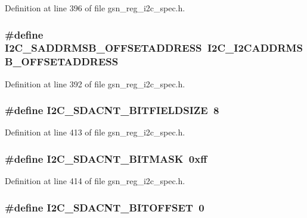 Definition at line 396 of file gsn\_\-reg\_\-i2c\_\-spec.h.

\hypertarget{a00558_a096049abd13309f06e39d53741cd8c53}{
\subsubsection[{I2C\_\-SADDRMSB\_\-OFFSETADDRESS}]{\setlength{\rightskip}{0pt plus 5cm}\#define I2C\_\-SADDRMSB\_\-OFFSETADDRESS~I2C\_\-I2CADDRMSB\_\-OFFSETADDRESS}}
\label{a00558_a096049abd13309f06e39d53741cd8c53}


Definition at line 392 of file gsn\_\-reg\_\-i2c\_\-spec.h.

\hypertarget{a00558_acf0200b09d20b7746674e7951f0fa3d8}{
\subsubsection[{I2C\_\-SDACNT\_\-BITFIELDSIZE}]{\setlength{\rightskip}{0pt plus 5cm}\#define I2C\_\-SDACNT\_\-BITFIELDSIZE~8}}
\label{a00558_acf0200b09d20b7746674e7951f0fa3d8}


Definition at line 413 of file gsn\_\-reg\_\-i2c\_\-spec.h.

\hypertarget{a00558_aab1926caecb04bb69a177f0e4c88cf61}{
\subsubsection[{I2C\_\-SDACNT\_\-BITMASK}]{\setlength{\rightskip}{0pt plus 5cm}\#define I2C\_\-SDACNT\_\-BITMASK~0xff}}
\label{a00558_aab1926caecb04bb69a177f0e4c88cf61}


Definition at line 414 of file gsn\_\-reg\_\-i2c\_\-spec.h.

\hypertarget{a00558_a779505c1b224579dc95d705c41ffa468}{
\subsubsection[{I2C\_\-SDACNT\_\-BITOFFSET}]{\setlength{\rightskip}{0pt plus 5cm}\#define I2C\_\-SDACNT\_\-BITOFFSET~0}}
\label{a00558_a779505c1b224579dc95d705c41ffa468}


